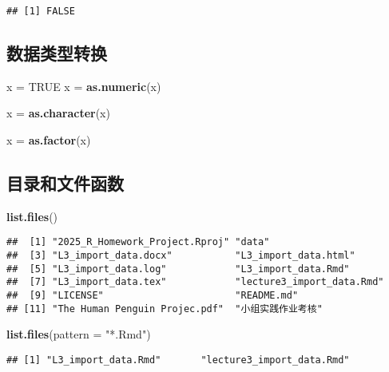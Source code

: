 \documentclass[
]{article}
\newenvironment{Shaded}{\begin{snugshade}}{\end{snugshade}}
\newcommand{\AttributeTok}[1]{\textcolor[rgb]{0.13,0.29,0.53}{#1}}
\newcommand{\ConstantTok}[1]{\textcolor[rgb]{0.56,0.35,0.01}{#1}}
\newcommand{\FunctionTok}[1]{\textcolor[rgb]{0.13,0.29,0.53}{\textbf{#1}}}
\newcommand{\NormalTok}[1]{#1}
\newcommand{\OtherTok}[1]{\textcolor[rgb]{0.56,0.35,0.01}{#1}}
\newcommand{\StringTok}[1]{\textcolor[rgb]{0.31,0.60,0.02}{#1}}
\begin{document}
\begin{verbatim}
## [1] FALSE
\end{verbatim}

\subsection{数据类型转换}\label{ux6570ux636eux7c7bux578bux8f6cux6362}

\begin{Shaded}
\begin{Highlighting}[]
\NormalTok{x }\OtherTok{=} \ConstantTok{TRUE}
\NormalTok{x }\OtherTok{=} \FunctionTok{as.numeric}\NormalTok{(x)}

\NormalTok{x }\OtherTok{=} \FunctionTok{as.character}\NormalTok{(x)}

\NormalTok{x }\OtherTok{=} \FunctionTok{as.factor}\NormalTok{(x)}
\end{Highlighting}
\end{Shaded}

\subsection{目录和文件函数}\label{ux76eeux5f55ux548cux6587ux4ef6ux51fdux6570}

\begin{Shaded}
\begin{Highlighting}[]
\FunctionTok{list.files}\NormalTok{()}
\end{Highlighting}
\end{Shaded}

\begin{verbatim}
##  [1] "2025_R_Homework_Project.Rproj" "data"                         
##  [3] "L3_import_data.docx"           "L3_import_data.html"          
##  [5] "L3_import_data.log"            "L3_import_data.Rmd"           
##  [7] "L3_import_data.tex"            "lecture3_import_data.Rmd"     
##  [9] "LICENSE"                       "README.md"                    
## [11] "The Human Penguin Projec.pdf"  "小组实践作业考核"
\end{verbatim}

\begin{Shaded}
\begin{Highlighting}[]
\FunctionTok{list.files}\NormalTok{(}\AttributeTok{pattern =} \StringTok{"*.Rmd"}\NormalTok{)}
\end{Highlighting}
\end{Shaded}

\begin{verbatim}
## [1] "L3_import_data.Rmd"       "lecture3_import_data.Rmd"
\end{verbatim}
\end{document}
